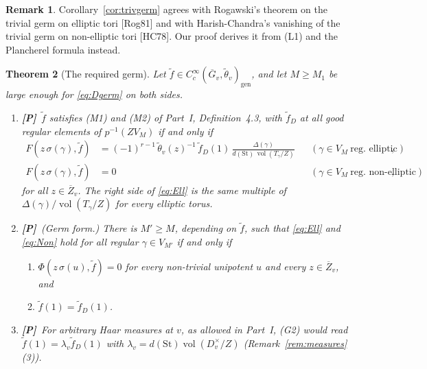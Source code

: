\documentclass[12pt]{article}
\newcommand{\ov}[1]{\overline{#1}}
\newcommand{\gen}{\mathrm{gen}}
\newcommand{\vol}{\operatorname{vol}}
\newcommand{\St}{\mathrm{St}}
\newcommand{\Gb}{\ov{G}}
\newcommand{\Zb}{\ov{Z}}
\newcommand{\sg}{\sigma}
\newcommand{\Pv}{\textbf{[P]}}
\theoremstyle{plain}
\newtheorem{theorem}{Theorem}[section]
\theoremstyle{definition}
\newtheorem{remark}[theorem]{Remark}
\begin{document}
\begin{remark}
Corollary~\ref{cor:trivgerm} agrees with Rogawski's theorem on the trivial germ on elliptic tori [Rog81] and with Harish-Chandra's vanishing of the trivial germ on non-elliptic tori [HC78]. Our proof derives it from (L1) and the Plancherel formula instead.
\end{remark}

\begin{theorem}[The required germ]\label{thm:germ}
Let $\tilde f\in C_c^\infty(\Gb_v,\tilde\theta_v)_\gen$, and let $M\ge M_1$ be large enough for \eqref{eq:Dgerm} on both sides.
\begin{enumerate}[label=(\alph*)]
\item \Pv\ $\tilde f$ satisfies (M1) and (M2) of Part~I, Definition~4.3, with $\tilde f_D$ at all good regular elements of $p^{-1}(ZV_M)$ if and only if
\begin{align}
F(z\,\sg(\gamma),\tilde f)&=(-1)^{r-1}\,\tilde\theta_v(z)^{-1}\,\tilde f_D(1)\,\frac{\Delta(\gamma)}{d(\St)\,\vol(T_\gamma/Z)}&&(\gamma\in V_M\ \text{reg.\ elliptic}),\tag{Ell}\label{eq:Ell}\\
F(z\,\sg(\gamma),\tilde f)&=0&&(\gamma\in V_M\ \text{reg.\ non-elliptic}),\tag{Non}\label{eq:Non}
\end{align}
for all $z\in\Zb_v$. The right side of \eqref{eq:Ell} is the same multiple of $\Delta(\gamma)/\vol(T_\gamma/Z)$ for every elliptic torus.
\item \Pv\ (Germ form.) There is $M'\ge M$, depending on $\tilde f$, such that \eqref{eq:Ell} and \eqref{eq:Non} hold for all regular $\gamma\in V_{M'}$ if and only if
\begin{enumerate}[label=(G\arabic*)]
\item $\Phi(z\,\sg(u),\tilde f)=0$ for every non-trivial unipotent $u$ and every $z\in\Zb_v$, and
\item $\tilde f(1)=\tilde f_D(1)$.
\end{enumerate}
\item \Pv\ For arbitrary Haar measures at $v$, as allowed in Part~I, (G2) would read $\tilde f(1)=\lambda_v\tilde f_D(1)$ with $\lambda_v=d(\St)\vol(D_v^\times/Z)$ (Remark~\ref{rem:measures}(3)).
\end{enumerate}
\end{theorem}
\end{document}
